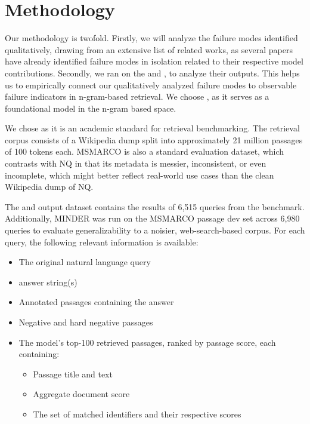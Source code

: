 \section{Methodology}

Our methodology is twofold. Firstly, we will analyze the failure modes identified qualitatively, drawing from an extensive list of related works, as several papers have already identified failure modes in isolation related to their respective  model contributions. Secondly, we ran  on the  \cite{kwiatkowski-natural-questions} and  \cite{payal-bajaj-ms-marco}, to analyze their outputs. This helps us to empirically connect our qualitatively analyzed failure modes to observable failure indicators in n-gram-based retrieval. We choose , as it serves as a foundational model in the n-gram based  space.

We chose  as it is an academic standard for retrieval benchmarking. The  retrieval corpus consists of a Wikipedia dump split into approximately 21 million passages of 100 tokens each. MSMARCO is also a standard evaluation dataset, which contrasts with NQ in that its metadata is messier, inconsistent, or even incomplete, which might better reflect real-world use cases than the clean Wikipedia dump of NQ.

The  and  output dataset contains the results of 6,515 queries from the  benchmark. Additionally, MINDER was run on the MSMARCO passage dev set across 6,980 queries to evaluate generalizability to a noisier, web-search-based corpus. For each query, the following relevant information is available:

\begin{itemize}
    \item The original natural language query
    \item {} answer string(s)
    \item Annotated passages containing the answer
    \item Negative and hard negative passages
    \item The model's top-100 retrieved passages, ranked by passage score, each containing:
    \begin{itemize}
        \item Passage title and text
        \item Aggregate document score
        \item The set of matched identifiers and their respective scores
    \end{itemize}
\end{itemize}

